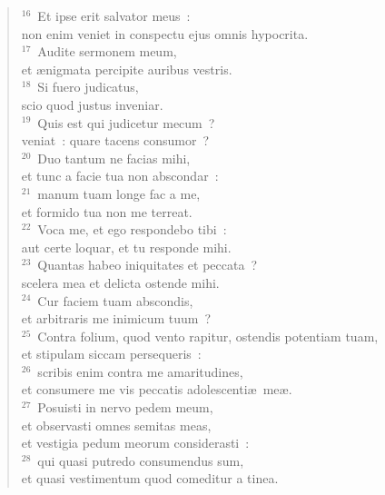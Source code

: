 \begin{flushleft}
\begin{verse}
${}^{16}$~Et ipse erit salvator meus~:\\ non enim veniet in conspectu ejus omnis hypocrita.\\
${}^{17}$~Audite sermonem meum,\\ et \ae nigmata percipite auribus vestris.\\
${}^{18}$~Si fuero judicatus,\\ scio quod justus inveniar.\\
${}^{19}$~Quis est qui judicetur mecum~?\\ veniat~: quare tacens consumor~?\\
${}^{20}$~Duo tantum ne facias mihi,\\ et tunc a facie tua non abscondar~:\\
${}^{21}$~manum tuam longe fac a me,\\ et formido tua non me terreat.\\
${}^{22}$~Voca me, et ego respondebo tibi~:\\ aut certe loquar, et tu responde mihi.\\
${}^{23}$~Quantas habeo iniquitates et peccata~?\\ scelera mea et delicta ostende mihi.\\
${}^{24}$~Cur faciem tuam abscondis,\\ et arbitraris me inimicum tuum~?\\
${}^{25}$~Contra folium, quod vento rapitur, ostendis potentiam tuam,\\ et stipulam siccam persequeris~:\\
${}^{26}$~scribis enim contra me amaritudines,\\ et consumere me vis peccatis adolescenti\ae\ me\ae .\\
${}^{27}$~Posuisti in nervo pedem meum,\\ et observasti omnes semitas meas,\\ et vestigia pedum meorum considerasti~:\\
${}^{28}$~qui quasi putredo consumendus sum,\\ et quasi vestimentum quod comeditur a tinea.\end{verse}\end{flushleft}


